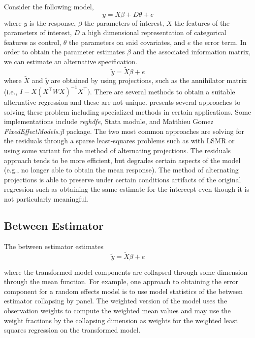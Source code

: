 \documentclass{juliacon}
\begin{document}
Consider the following model,
\begin{equation}
	y = X \beta + D \theta + e
\end{equation}
where $y$ is the response, $\beta$ the parameters of interest, $X$ the features of the parameters of interest, $D$ a high dimensional representation of categorical features as control, $\theta$ the parameters on said covariates, and $e$ the error term. In order to obtain the parameter estimates $\beta$ and the associated information matrix, we can estimate an alternative specification.
\begin{equation}
	\tilde{y} = \tilde{X} \beta + e
\end{equation}
where $\tilde{X}$ and $\tilde{y}$ are obtained by using projections, such as the annihilator matrix (i.e., $I - X \left(X^{\top}W X\right)^{-1} X^{\top})$. There are several methods to obtain a suitable alternative regression and these are not unique. \cite{reghdfe} presents several approaches to solving these problem including specialized methods in certain applications. Some implementations include \textit{reghdfe}, Stata module, and Matthieu Gomez \textit{FixedEffectModels.jl} package. The two most common approaches are solving for the residuals through a sparse least-squares problems such as with LSMR \cite{LSMR} or using some variant for the method of alternating projections. The residuals approach tends to be more efficient, but degrades certain aspects of the model (e.g., no longer able to obtain the mean response). The method of alternating projections is able to preserve under certain conditions artifacts of the original regression such as obtaining the same estimate for the intercept even though it is not particularly meaningful.

\subsection{Between Estimator}

The between estimator estimates
\begin{equation}
	\tilde{y} = \tilde{X} \beta + e
\end{equation}

where the transformed model components are collapsed through some dimension through the mean function. For example, one approach to obtaining the error component for a random effects model is to use model statistics of the between estimator collapsing by panel. The weighted version of the model uses the observation weights to compute the weighted mean values and may use the weight fractions by the collapsing dimension as weights for the weighted least squares regression on the transformed model.
\end{document}
